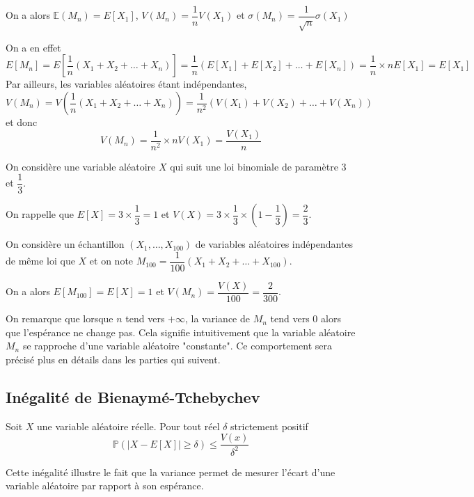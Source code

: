 \documentclass[11pt,fleqn, openany]{book} %
\begin{document}
\begin{proposition}On a alors $\mathbb{E}(M_n)=E[X_1]$, $V(M_n)=\dfrac{1}{n}V(X_1)$ et $\sigma(M_n)=\dfrac{1}{\sqrt{n}}\sigma(X_1)$\end{proposition}

\begin{demonstration}On a en effet
\[ E[M_n]=E\left[\dfrac{1}{n} (X_1+X_2+\ldots + X_n)\right]=\dfrac{1}{n}(E[X_1]+E[X_2]+\dots + E[X_n])=\dfrac{1}{n} \times nE[X_1] = E[X_1]\]
Par ailleurs, les variables aléatoires étant indépendantes, 
\[ V(M_n)=V\left(\dfrac{1}{n} (X_1+X_2+\ldots + X_n)\right)=\dfrac{1}{n^2}(V(X_1)+V(X_2)+\dots + V(X_n))\]
et donc 
\[V(M_n)=\dfrac{1}{n^2} \times nV(X_1) = \dfrac{V(X_1)}{n}\]
\end{demonstration}


\begin{example} On considère une variable aléatoire $X$ qui suit une loi binomiale de paramètre $3$ et $\dfrac{1}{3}$. 

On rappelle que $E[X]=3\times \dfrac{1}{3}=1$ et $V(X)=3\times \dfrac{1}{3} \times \left(1-\dfrac{1}{3}\right)=\dfrac{2}{3}$.

On considère un échantillon $(X_1, \ldots, X_{100})$ de variables aléatoires indépendantes de même loi que $X$ et on note $M_{100} = \dfrac{1}{100} (X_1+X_2+\ldots + X_{100})$.

On a alors $E[M_{100}]=E[X]=1$ et $V(M_n)=\dfrac{V(X)}{100}=\dfrac{2}{300}$.\end{example}

On remarque que lorsque $n$ tend vers $+\infty$, la variance de $M_n$ tend vers 0 alors que l'espérance ne change pas. Cela signifie intuitivement que la variable aléatoire $M_n$ se rapproche d'une variable aléatoire "constante". Ce comportement sera précisé plus en détails dans les parties qui suivent.

\newpage 
\subsection{Inégalité de Bienaymé-Tchebychev}

\begin{proposition} Soit $X$ une variable aléatoire réelle. Pour tout réel $\delta$ strictement positif
\[ \mathbb{P}(|X-E[X]| \geqslant \delta) \leqslant \dfrac{V(x)}{\delta ^2}\]
\vspace{-0,5cm}\end{proposition}

Cette inégalité illustre le fait que la variance permet de mesurer l'écart d'une variable aléatoire par rapport à son espérance.
\end{document}

